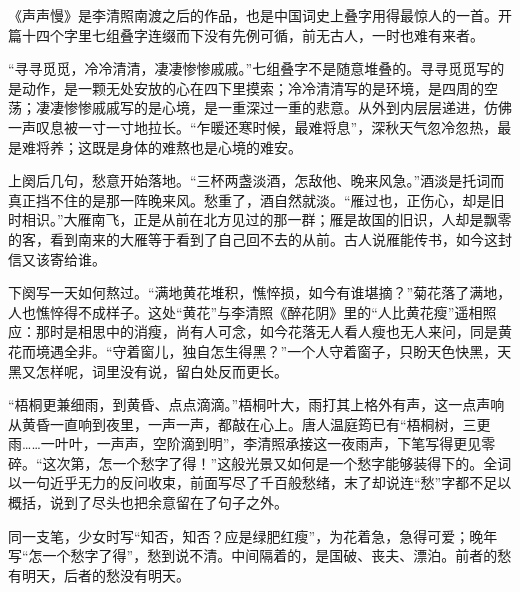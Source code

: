 \begin{appreciation}
《声声慢》是李清照南渡之后的作品，也是中国词史上叠字用得最惊人的一首。开篇十四个字里七组叠字连缀而下没有先例可循，前无古人，一时也难有来者。

“寻寻觅觅，冷冷清清，凄凄惨惨戚戚。”七组叠字不是随意堆叠的。寻寻觅觅写的是动作，是一颗无处安放的心在四下里摸索；冷冷清清写的是环境，是四周的空荡；凄凄惨惨戚戚写的是心境，是一重深过一重的悲意。从外到内层层递进，仿佛一声叹息被一寸一寸地拉长。“乍暖还寒时候，最难将息”，深秋天气忽冷忽热，最是难将养；这既是身体的难熬也是心境的难安。

上阕后几句，愁意开始落地。“三杯两盏淡酒，怎敌他、晚来风急。”酒淡是托词而真正挡不住的是那一阵晚来风。愁重了，酒自然就淡。“雁过也，正伤心，却是旧时相识。”大雁南飞，正是从前在北方见过的那一群；雁是故国的旧识，人却是飘零的客，看到南来的大雁等于看到了自己回不去的从前。古人说雁能传书，如今这封信又该寄给谁。

下阕写一天如何熬过。“满地黄花堆积，憔悴损，如今有谁堪摘？”菊花落了满地，人也憔悴得不成样子。这处“黄花”与李清照《醉花阴》里的“人比黄花瘦”遥相照应：那时是相思中的消瘦，尚有人可念，如今花落无人看人瘦也无人来问，同是黄花而境遇全非。“守着窗儿，独自怎生得黑？”一个人守着窗子，只盼天色快黑，天黑又怎样呢，词里没有说，留白处反而更长。

“梧桐更兼细雨，到黄昏、点点滴滴。”梧桐叶大，雨打其上格外有声，这一点声响从黄昏一直响到夜里，一声一声，都敲在心上。唐人温庭筠已有“梧桐树，三更雨……一叶叶，一声声，空阶滴到明”，李清照承接这一夜雨声，下笔写得更见零碎。“这次第，怎一个愁字了得！”这般光景又如何是一个愁字能够装得下的。全词以一句近乎无力的反问收束，前面写尽了千百般愁绪，末了却说连“愁”字都不足以概括，说到了尽头也把余意留在了句子之外。

同一支笔，少女时写“知否，知否？应是绿肥红瘦”，为花着急，急得可爱；晚年写“怎一个愁字了得”，愁到说不清。中间隔着的，是国破、丧夫、漂泊。前者的愁有明天，后者的愁没有明天。
\end{appreciation}
